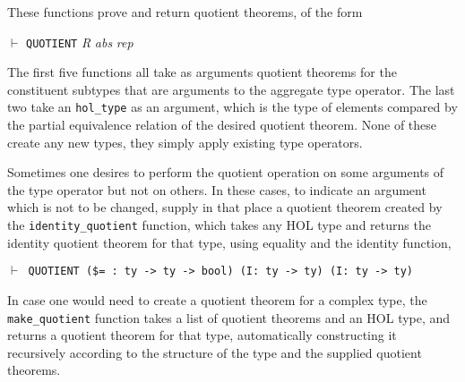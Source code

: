 \documentclass[envcountsame,runningheads]{llncs}
\newcommand{\quotient}{partial equivalence}
\begin{document}
These functions prove and return quotient theorems,
of the form
\begin{center}
$\vdash$ {\tt QUOTIENT} {\it R\/} {\it abs\/} {\it rep}
\end{center}
%
The first five functions all take as arguments quotient theorems
for the constituent subtypes that are arguments
to the aggregate type operator.  The last two take an {\tt hol\_type} as
an argument, which is the type of elements compared by the \quotient{} relation
of the desired quotient theorem.
None of these create any new types,
they simply apply existing type operators.

Sometimes one desires to perform the quotient operation on some
arguments of the type operator but not on others. In these
cases, to indicate an argument which is not to be changed,
supply in that place
a quotient theorem
created by the
{\tt identity\_quotient} function, which takes any HOL type and
returns the identity quotient theorem for that type,
using equality and the identity function,

\begin{center}
{\tt $\vdash$ QUOTIENT (\$= : ty -> ty -> bool) (I: ty -> ty) (I: ty -> ty)}
\end{center}

In case one would need to create a quotient theorem for a complex type,
the {\tt make\_quotient} function takes a list of
quotient theorems and an HOL type, and returns a quotient theorem for
that type, automatically constructing it recursively
according to the structure of the type
and the supplied quotient theorems.
\begin{comment}
\end{comment}

\end{document}
